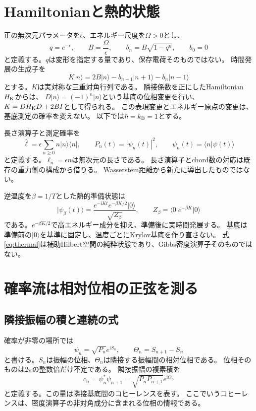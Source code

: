 \documentclass[a4paper,11pt]{ltjsarticle}
\numberwithin{equation}{section}
\newcommand{\ket}[1]{\lvert #1\rangle}
\newcommand{\bra}[1]{\langle #1\rvert}
\newcommand{\ii}{\mathrm i}
\begin{document}
\section{Hamiltonianと熱的状態}
正の無次元パラメータを$\epsilon$、エネルギー尺度を$\Omega>0$とし、
\begin{equation}
 q=e^{-\epsilon},\qquad B=\frac{\Omega}{\epsilon},\qquad
 b_n=B\sqrt{1-q^n},\qquad b_0=0
 \label{eq:links}
\end{equation}
と定義する。$q$は変形を指定する量であり、保存電荷そのものではない。
時間発展の生成子を
\begin{equation}
 K\ket n=2B\ket n-b_{n+1}\ket{n+1}-b_n\ket{n-1}
 \label{eq:K}
\end{equation}
とする。$K$は実対称な三重対角行列である。
隣接係数を正にしたHamiltonian$H_{\rm K}$からは、
$D\ket n=(-1)^n\ket n$という基底の位相変更を行い、
$K=D H_{\rm K}D+2B I$として得られる。
この表現変更とエネルギー原点の変更は、基底測定の確率を変えない。
以下では$\hbar=k_{\rm B}=1$とする。

長さ演算子と測定確率を
\begin{equation}
 \hat\ell=\epsilon\sum_{n\geq0}n\ket n\bra n,
 \qquad P_n(t)=|\psi_n(t)|^2,
 \qquad \psi_n(t)=\bra n\psi(t)\rangle
 \label{eq:length}
\end{equation}
と定義する。$\ell_n=\epsilon n$は無次元の長さである。
長さ演算子とchord数の対応は既存の重力側の構成から借りる\cite{Heller}。
Wasserstein距離から新たに導出したものではない。

逆温度を$\beta=1/T$とした熱的準備状態は
\begin{equation}
 \ket{\psi_\beta(t)}=\frac{e^{-\ii Kt}e^{-\beta K/2}\ket0}{\sqrt{Z_\beta}},
 \qquad Z_\beta=\bra0 e^{-\beta K}\ket0
 \label{eq:thermal}
\end{equation}
である。$e^{-\beta K/2}$で高エネルギー成分を抑え、準備後に実時間発展する。
基底は準備前の$\ket0$を基準に固定し、温度ごとにKrylov基底を作り直さない。
式\eqref{eq:thermal}は補助Hilbert空間の純粋状態であり、Gibbs密度演算子そのものではない。

\section{確率流は相対位相の正弦を測る}
\subsection{隣接振幅の積と連続の式}
確率が非零の場所では
\begin{equation}
 \psi_n=\sqrt{P_n}e^{\ii S_n},\qquad
 \Theta_n=S_{n+1}-S_n
 \label{eq:phase}
\end{equation}
と書ける。$S_n$は振幅の位相、$\Theta_n$は隣接する振幅間の相対位相である。
位相そのものは$2\pi$の整数倍だけ不定である。
隣接振幅の複素積を
\begin{equation}
 c_n=\psi_n^*\psi_{n+1}
 =\sqrt{P_nP_{n+1}}e^{\ii\Theta_n}
 \label{eq:coherence}
\end{equation}
と定義する。この量は隣接基底間のコヒーレンスを表す。
ここでいうコヒーレンスは、密度演算子の非対角成分に含まれる位相の情報である。
\end{document}
